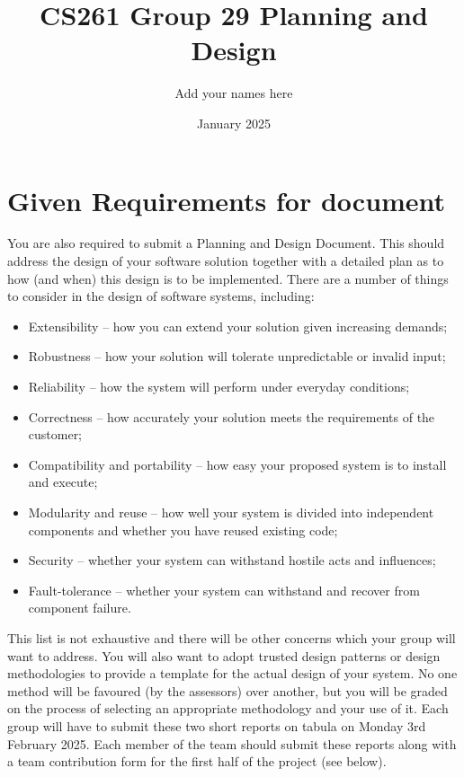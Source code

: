 \documentclass{article}
\title{CS261 Group 29 Planning and Design}
\author{Add your names here}
\date{January 2025}
\begin{document}
\maketitle
\tableofcontents

\section{Given Requirements for document}
You are also required to submit a Planning and Design Document. This should address the design of your software solution together with a detailed plan as to how (and when) this design is to be implemented. There are a number of things to consider in the design of software systems, including:

\begin{itemize}
    \item Extensibility – how you can extend your solution given increasing demands;
    \item Robustness – how your solution will tolerate unpredictable or invalid input;
    \item Reliability – how the system will perform under everyday conditions;
    \item Correctness – how accurately your solution meets the requirements of the customer;
    \item Compatibility and portability – how easy your proposed system is to install and execute;
    \item Modularity and reuse – how well your system is divided into independent components and whether you have reused existing code;
    \item Security – whether your system can withstand hostile acts and influences;
    \item Fault-tolerance – whether your system can withstand and recover from component failure.
\end{itemize}

This list is not exhaustive and there will be other concerns which your group will want to address. You will also want to adopt trusted design patterns or design methodologies to provide a template for the actual design of your system. No one method will be favoured (by the assessors) over another, but you will be graded on the process of selecting an appropriate methodology and your use of it.
Each group will have to submit these two short reports on tabula on Monday 3rd February 2025. Each member of the team should submit these reports along with a team contribution form for the first half of the project (see below). 
\end{document}

